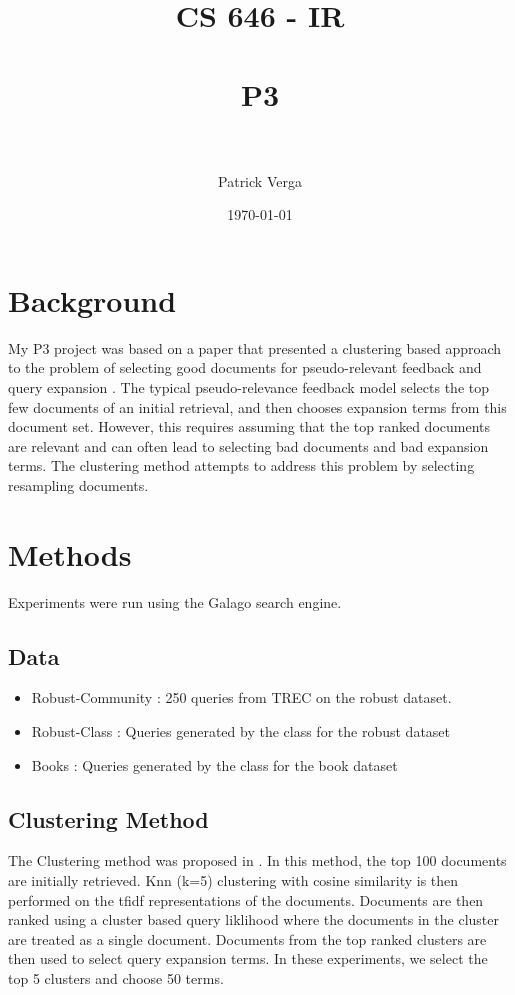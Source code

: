 \documentclass[paper=a4, fontsize=11pt]{scrartcl} %
\title{	
\normalfont \normalsize 
\textsc{CS 646 - IR} \\ [25pt] %
\horrule{0.5pt} \\[0.4cm] %
\huge P3 \\ %
\horrule{2pt} \\[0.5cm] %
}
\author{Patrick Verga} %
\date{\normalsize\today} %
\numberwithin{equation}{section} %
\numberwithin{figure}{section} %
\numberwithin{table}{section} %
\begin{document}
\maketitle %


\section {Background}

My P3 project was based on a paper that presented a clustering based approach to the problem of selecting good documents for pseudo-relevant feedback and query expansion \cite{Lee2008}. The typical pseudo-relevance feedback model selects the top few documents of an initial retrieval, and then chooses expansion terms from this document set. However, this requires assuming that the top ranked documents are relevant and can often lead to selecting bad documents and bad expansion terms. The clustering method attempts to address this problem by selecting resampling documents.

\section {Methods}

Experiments were run using the Galago search engine. 

\subsection {Data}
\begin {itemize}
\item Robust-Community : 250 queries from TREC on the robust dataset.
\item Robust-Class : Queries generated by the class for the robust dataset
\item Books : Queries generated by the class for the book dataset
\end {itemize} 

\subsection {Clustering Method}
The Clustering method was proposed in \cite{Lee2008}. In this method, the top 100 documents are initially retrieved. Knn (k=5) clustering with cosine similarity is then performed on the tfidf representations of the documents. Documents are then ranked using a cluster based query liklihood where the documents in the cluster are treated as a single document. Documents from the top ranked clusters are then used to select query expansion terms. In these experiments, we select the top 5 clusters and choose 50 terms.
\end{document}
